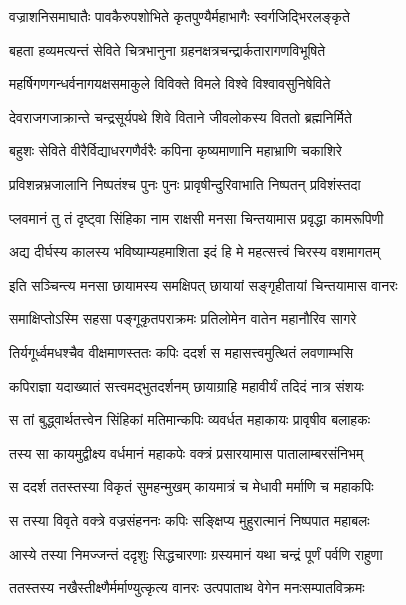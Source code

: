 \twolineshloka
{वज्राशनिसमाघातैः पावकैरुपशोभिते}
{कृतपुण्यैर्महाभागैः स्वर्गजिद्भिरलङ्कृते} %

\twolineshloka
{बहता हव्यमत्यन्तं सेविते चित्रभानुना}
{ग्रहनक्षत्रचन्द्रार्कतारागणविभूषिते} %

\twolineshloka
{महर्षिगणगन्धर्वनागयक्षसमाकुले}
{विविक्ते विमले विश्वे विश्वावसुनिषेविते} %

\twolineshloka
{देवराजगजाक्रान्ते चन्द्रसूर्यपथे शिवे}
{विताने जीवलोकस्य विततो ब्रह्मनिर्मिते} %

\twolineshloka
{बहुशः सेविते वीरैर्विद्याधरगणैर्वरैः}
{कपिना कृष्यमाणानि महाभ्राणि चकाशिरे} %

\twolineshloka
{प्रविशन्नभ्रजालानि निष्पतंश्च पुनः पुनः}
{प्रावृषीन्दुरिवाभाति निष्पतन् प्रविशंस्तदा} %

\twolineshloka
{प्लवमानं तु तं दृष्ट्वा सिंहिका नाम राक्षसी}
{मनसा चिन्तयामास प्रवृद्धा कामरूपिणी} %

\twolineshloka
{अद्य दीर्घस्य कालस्य भविष्याम्यहमाशिता}
{इदं हि मे महत्सत्त्वं चिरस्य वशमागतम्} %

\twolineshloka
{इति सञ्चिन्त्य मनसा छायामस्य समक्षिपत्}
{छायायां सङ्गृहीतायां चिन्तयामास वानरः} %

\twolineshloka
{समाक्षिप्तोऽस्मि सहसा पङ्गूकृतपराक्रमः}
{प्रतिलोमेन वातेन महानौरिव सागरे} %

\twolineshloka
{तिर्यगूर्ध्वमधश्चैव वीक्षमाणस्ततः कपिः}
{ददर्श स महासत्त्वमुत्थितं लवणाम्भसि} %

\twolineshloka
{कपिराज्ञा यदाख्यातं सत्त्वमद्भुतदर्शनम्}
{छायाग्राहि महावीर्यं तदिदं नात्र संशयः} %

\twolineshloka
{स तां बुद्ध्वार्थतत्त्वेन सिंहिकां मतिमान्कपिः}
{व्यवर्धत महाकायः प्रावृषीव बलाहकः} %

\twolineshloka
{तस्य सा कायमुद्वीक्ष्य वर्धमानं महाकपेः}
{वक्त्रं प्रसारयामास पातालाम्बरसंनिभम्} %

\twolineshloka
{स ददर्श ततस्तस्या विकृतं सुमहन्मुखम्}
{कायमात्रं च मेधावी मर्माणि च महाकपिः} %

\twolineshloka
{स तस्या विवृते वक्त्रे वज्रसंहननः कपिः}
{सङ्क्षिप्य मुहुरात्मानं निष्पपात महाबलः} %

\twolineshloka
{आस्ये तस्या निमज्जन्तं ददृशुः सिद्धचारणाः}
{ग्रस्यमानं यथा चन्द्रं पूर्णं पर्वणि राहुणा} %

\twolineshloka
{ततस्तस्य नखैस्तीक्ष्णैर्मर्माण्युत्कृत्य वानरः}
{उत्पपाताथ वेगेन मनःसम्पातविक्रमः} %

